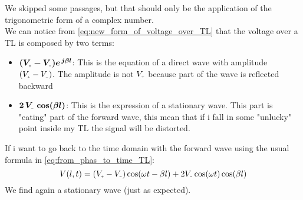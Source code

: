   We skipped some passages, but that should only be the application of the trigonometric form of a complex number.\\
  We can notice from \cref{eq:new_form_of_voltage_over_TL} that the voltage over a TL is composed by two terms:
  \begin{itemize}
      \item $\bm{(V\bottomPlus - V\bottomMinus)e^{\,j\beta l}}$: This is the equation of a direct wave with amplitude $(V\bottomPlus - V\bottomMinus)$. The amplitude is not $V\bottomPlus$ because part of the wave is reflected backward
      \item $\bm{2\,V\bottomMinus\,\cos(\beta l)}$: This is the expression of a stationary wave. This part is "eating" part of the forward wave, this mean that if i fall in some "unlucky" point inside my TL the signal will be distorted.
  \end{itemize}

If i want to go back to the time domain with the forward wave using the usual formula in \cref{eq:from_phas_to_time_TL}:
\begin{equation}
    V(l,t)=(V\bottomPlus - V\bottomMinus)\cos(\omega t-\beta l)+2V\bottomMinus\cos(\omega t)\cos(\beta l)
\end{equation}
We find again a stationary wave (just as expected).

